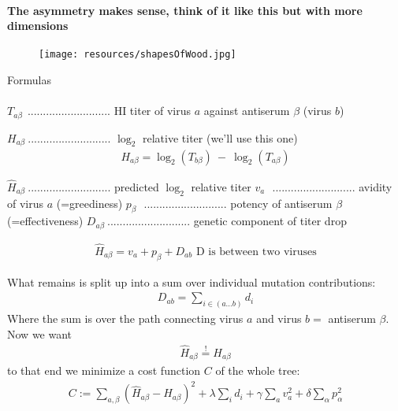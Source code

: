 \documentclass{beamer}
\begin{document}
\begin{darkframes}
    \begin{frame}{\subsecname}
      \framesubtitle{\small The asymmetry makes sense, think of it like this but with more dimensions}
      \begin{figure}
        \texttt{[image: resources/shapesOfWood.jpg]}
        \caption{\footnotesize \cite{rosipaw10}}
      \end{figure}
    \end{frame}

    \begin{frame}[allowframebreaks]{Formulas}
      \framesubtitle{}
      $T_{a\beta}~\ $........................... HI titer of virus $a$ against antiserum $\beta$ (virus $b$)

      $H_{a\beta}~$........................... $\log_2$ relative titer (we'll use this one)
      \begin{align}
        H_{a\beta} = \log_2 (T_{b\beta}) ~ - ~\log_2 ( T_{a\beta})
      \end{align}

      $\hat{H}_{a\beta}~$........................... predicted $\log_2$ relative titer
      $v_{a}~~~$........................... avidity of virus $a$ (=greediness)
      $p_{\beta}~~~$........................... potency of antiserum $\beta$ (=effectiveness)
      $D_{a\beta}~$........................... genetic component of titer drop

      \begin{align}
        \hat{H}_{a\beta} = v_a + p_\beta + D_{ab} \text{   D is between two viruses}
      \end{align}


      What remains is split up into a sum over individual mutation contributions:
      \begin{align}
        D_{ab} = \sum_{i \in (a ... b)} d_i
      \end{align}
      Where the sum is over the path connecting virus $a$ and virus $ b \stackrel{}={}$ antiserum $\beta$. Now we want
      \begin{align}
        \hat{H}_{a\beta} \stackrel{!}={} {H}_{a\beta}
      \end{align}
      to that end we minimize a cost function $C$ of the whole tree:
      \begin{align}
        C := \sum_{a,\beta}( \hat{H}_{a\beta} - {H}_{a\beta})^2 + \lambda \sum_i d_i + \gamma \sum_a v_a^2 + \delta \sum_\alpha p_\alpha^2
      \end{align}


\end{frame}
\end{darkframes}
\end{document}

